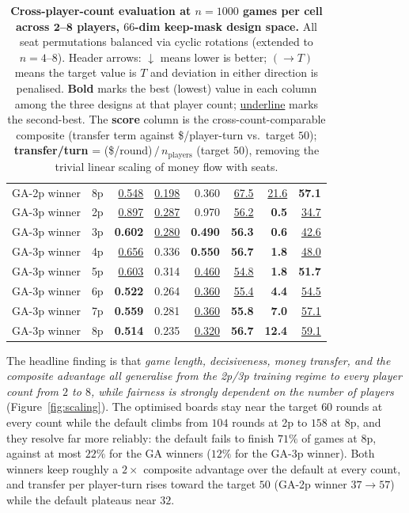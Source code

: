 \documentclass[10pt]{article}
\begin{document}
\begin{table}[!htbp]
\begin{tabular}{llrrrrrr}
GA-2p winner  & 8p & \underline{0.548} & \underline{0.198} & 0.360          & \underline{67.5} & \underline{21.6} & \textbf{57.1} \\
\addlinespace
GA-3p winner  & 2p & \underline{0.897} & \underline{0.287} & 0.970          & \underline{56.2} & \textbf{0.5}     & \underline{34.7} \\
GA-3p winner  & 3p & \textbf{0.602}    & \underline{0.280} & \textbf{0.490} & \textbf{56.3}    & \textbf{0.6}     & \underline{42.6} \\
GA-3p winner  & 4p & \underline{0.656} & 0.336             & \textbf{0.550} & \textbf{56.7}    & \textbf{1.8}     & \underline{48.0} \\
GA-3p winner  & 5p & \underline{0.603} & 0.314             & \underline{0.460} & \underline{54.8} & \textbf{1.8}     & \textbf{51.7} \\
GA-3p winner  & 6p & \textbf{0.522}    & 0.264             & \underline{0.360} & \underline{55.4} & \textbf{4.4}     & \underline{54.5} \\
GA-3p winner  & 7p & \textbf{0.559}    & 0.281             & \underline{0.360} & \textbf{55.8}    & \textbf{7.0}     & \underline{57.1} \\
GA-3p winner  & 8p & \textbf{0.514}    & 0.235             & \underline{0.320} & \textbf{56.7}    & \textbf{12.4}    & \underline{59.1} \\
\bottomrule
\end{tabular}
\caption{\textbf{Cross-player-count evaluation at $n{=}1000$ games
per cell across $\boldsymbol{2}$--$\boldsymbol{8}$ players,
$66$-dim keep-mask design space.} All seat permutations
balanced via cyclic rotations (extended to $n=4$--$8$). Header
arrows: $\downarrow$ means lower is better; $(\!\to\!T)$ means the
target value is $T$ and deviation in either direction is penalised.
\textbf{Bold} marks the best (lowest) value in each column among the
three designs at that player count; \underline{underline} marks the
second-best. The \textbf{score} column is the cross-count-comparable
composite (transfer term against \$/player-turn vs.\ target $50$);
\textbf{transfer/turn} = (\$/round)$\,/\,n_\text{players}$ (target
$50$), removing the trivial linear scaling of money flow with seats.}
\label{tab:cross}
\end{table}

The headline finding is that \emph{game length, decisiveness, money
transfer, and the composite advantage all generalise from the 2p/3p
training regime to every player count from $2$ to $8$, while fairness
is strongly dependent on the number of players}
(Figure~\ref{fig:scaling}). The optimised boards stay near the target
$60$ rounds at every count while the default climbs from $104$ rounds
at 2p to $158$ at 8p, and they resolve far more reliably: the default
fails to finish $71\%$ of games at 8p, against at most $22\%$ for the
GA winners ($12\%$ for the GA-3p winner). Both winners keep roughly a
$2\times$ composite advantage over the default at every count, and
transfer per player-turn rises toward the target $50$ (GA-2p winner
$37\!\to\!57$) while the default plateaus near $32$.
\end{document}
